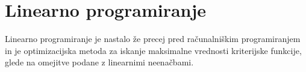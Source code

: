 \documentclass[10pt,a4paper,oneside]{book}
\begin{document}
\section{Linearno programiranje}
Linearno programiranje je nastalo že precej pred računalniškim programiranjem in je optimizacijska metoda za iskanje maksimalne vrednosti kriterijske funkcije, glede na omejitve podane z linearnimi neenačbami.\\

\end{document}
